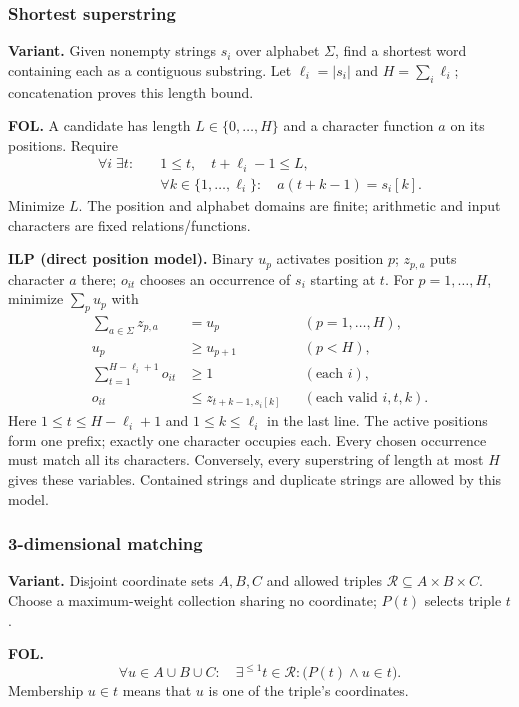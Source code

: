\subsubsection{Shortest superstring}\label{form:string}
\textbf{Variant.} Given nonempty strings $s_i$ over alphabet $\Sigma$, find
a shortest word containing each as a contiguous substring. Let
$\ell_i=|s_i|$ and $H=\sum_i\ell_i$; concatenation proves this length bound.

\textbf{FOL.} A candidate has length $L\in\{0,\ldots,H\}$ and a character
function $a$ on its positions. Require
\[
\begin{aligned}
 \forall i\;\exists t:\quad
 &1\le t,\quad t+\ell_i-1\le L,\\
 &\forall k\in\{1,\ldots,\ell_i\}:\quad a(t+k-1)=s_i[k].
\end{aligned}
\]
Minimize $L$. The position and alphabet domains are finite; arithmetic and
input characters are fixed relations/functions.

\textbf{ILP (direct position model).} Binary $u_p$ activates position $p$;
$z_{p,a}$ puts character $a$ there; $o_{it}$ chooses an occurrence of $s_i$
starting at $t$. For $p=1,\ldots,H$, minimize $\sum_pu_p$ with
\[
\begin{aligned}
 \sum_{a\in\Sigma}z_{p,a}&=u_p &&(p=1,\ldots,H),\\
 u_p&\ge u_{p+1} &&(p<H),\\
 \sum_{t=1}^{H-\ell_i+1}o_{it}&\ge1 &&(\text{each }i),\\
 o_{it}&\le z_{t+k-1,s_i[k]} &&(\text{each valid }i,t,k).
\end{aligned}
\]
Here $1\le t\le H-\ell_i+1$ and $1\le k\le\ell_i$ in the last line.
The active positions form one prefix; exactly one character occupies each.
Every chosen occurrence must match all its characters. Conversely, every
superstring of length at most $H$ gives these variables. Contained strings
and duplicate strings are allowed by this model.

\subsubsection{3-dimensional matching}\label{form:3dm}
\textbf{Variant.} Disjoint coordinate sets $A,B,C$ and allowed triples
$\mathcal R\subseteq A\times B\times C$. Choose a maximum-weight collection
sharing no coordinate; $P(t)$ selects triple $t$.

\textbf{FOL.}
\[
 \forall u\in A\cup B\cup C:\quad
 \exists^{\le1}t\in\mathcal R:\bigl(P(t)\land u\in t\bigr).
\]
Membership $u\in t$ means that $u$ is one of the triple's coordinates.

